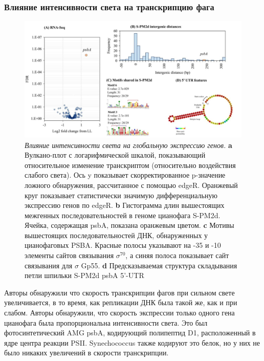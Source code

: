 \documentclass[14pt]{extarticle}
\begin{document}
    \begin{center}
        \item \subsubsection{Влияние интенсивности света на транскрипцию фага}
    \end{center}


    \begin{figure}[]
            \centering
            \includegraphics[width=\textwidth]{img/protein.jpg}
            \caption{\textit{Влияние интенсивности света на глобальную экспрессию генов.} \textbf{a} Вулкано-плот с
            логарифмической шкалой, показывающий относительное изменение транскриптом (относительно воздействия слабого
            света). Ось y показывает скорректированное p-значение ложного обнаружения, рассчитанное с помощью edgeR.
            Оранжевый круг показывает статистически значимую дифференциальную экспрессию генов по edgeR. \textbf{b}
            Гистограмма длин вышестоящих межгенных последовательностей в геноме цианофага S-PM2d. Ячейка, содержащая
            psbA, показана оранжевым цветом. \textbf{c} Мотивы вышестоящих последовательностей ДНК, обнаруженных у
            цианофаговых PSBA. Красные полосы указывают на -35 и -10 элементы сайтов связывания $\sigma^{70}$, а синяя
            полоса показывает сайт связывания для $\sigma$ Gp55. \textbf{d} Предсказываемая структура складывания петли
            шпильки S-PM2d psbA 5'-UTR \cite{puxty-evanx}}
            \label{fig:skybox}
    \end{figure}
    
    \par{Авторы обнаружили что скорость транскрипции фагов при сильном свете увеличивается, в то время, как репликации
    ДНК была такой же, как и при слабом. Авторы обнаружили, что скорость экспрессии только одного гена цианофага была
    пропорциональна интенсивности света. Это был фотосинтетический AMG psbA, кодирующий полипептид D1, расположенный в
    ядре центра реакции PSII. Synechococcus также кодируют это белок, но у них не было никаких увеличений в скорости 
    транскрипции. \cite{puxty-evanx}}
    
\end{document}
